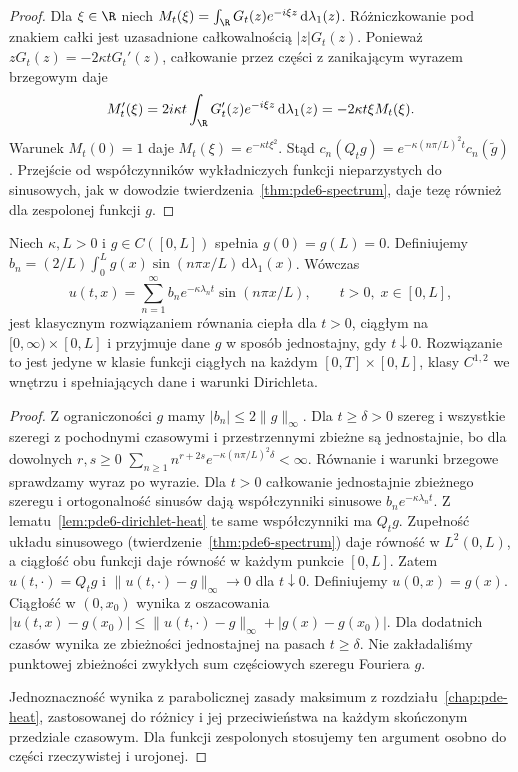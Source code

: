 \begin{proof}
Dla $\xi\in\R$ niech
$M_t(\xi)=\int_{\R}G_t(z)e^{-i\xi z}\,\mathrm d\lambda_1(z)$.
Różniczkowanie pod znakiem całki jest uzasadnione
całkowalnością $|z|G_t(z)$. Ponieważ
$zG_t(z)=-2\kappa tG_t'(z)$, całkowanie przez części
z zanikającym wyrazem brzegowym daje
\[
 M_t'(\xi)=2i\kappa t\int_{\R}G_t'(z)e^{-i\xi z}
 \,\mathrm d\lambda_1(z)=-2\kappa t\xi M_t(\xi).
\]
Warunek $M_t(0)=1$ daje $M_t(\xi)=e^{-\kappa t\xi^2}$.
Stąd $c_n(Q_tg)=e^{-\kappa(n\pi/L)^2t}c_n(\widetilde g)$.
Przejście od współczynników wykładniczych funkcji
nieparzystych do sinusowych, jak w dowodzie
twierdzenia~\ref{thm:pde6-spectrum}, daje tezę również
dla zespolonej funkcji $g$.
\end{proof}

\begin{twierdzenie}
\label{thm:pde6-heat}
Niech $\kappa,L>0$ i $g\in C([0,L])$ spełnia
$g(0)=g(L)=0$. Definiujemy
$b_n=(2/L)\int_0^Lg(x)\sin(n\pi x/L)\,\mathrm d\lambda_1(x)$.
Wówczas
\begin{equation}\label{eq:pde6-heat}
 u(t,x)=\sum_{n=1}^\infty b_n e^{-\kappa\lambda_nt}
 \sin(n\pi x/L),\qquad t>0,\;x\in[0,L],
\end{equation}
jest klasycznym rozwiązaniem równania ciepła dla $t>0$,
ciągłym na $[0,\infty)\times[0,L]$ i przyjmuje dane $g$
w sposób jednostajny, gdy $t\downarrow0$. Rozwiązanie to
jest jedyne w klasie funkcji ciągłych na każdym
$[0,T]\times[0,L]$, klasy $C^{1,2}$ we wnętrzu
i spełniających dane i warunki Dirichleta.
\end{twierdzenie}
\begin{proof}
Z ograniczoności $g$ mamy $|b_n|\le2\|g\|_\infty$.
Dla $t\ge\delta>0$ szereg i wszystkie szeregi
z pochodnymi czasowymi i przestrzennymi zbieżne są
jednostajnie, bo dla dowolnych $r,s\ge0$
$\sum_{n\ge1}n^{r+2s}e^{-\kappa(n\pi/L)^2\delta}<\infty$.
Równanie i warunki brzegowe sprawdzamy wyraz po wyrazie.
Dla $t>0$ całkowanie jednostajnie zbieżnego szeregu
i ortogonalność sinusów dają współczynniki sinusowe
$b_ne^{-\kappa\lambda_nt}$. Z lematu~\ref{lem:pde6-dirichlet-heat}
te same współczynniki ma $Q_tg$. Zupełność układu
sinusowego (twierdzenie~\ref{thm:pde6-spectrum})
daje równość w $L^2(0,L)$, a ciągłość obu funkcji
daje równość w każdym punkcie $[0,L]$.
Zatem $u(t,\cdot)=Q_tg$ i
$\|u(t,\cdot)-g\|_\infty\to0$ dla $t\downarrow0$.
Definiujemy $u(0,x)=g(x)$. Ciągłość w $(0,x_0)$
wynika z oszacowania
$|u(t,x)-g(x_0)|\le\|u(t,\cdot)-g\|_\infty+|g(x)-g(x_0)|$.
Dla dodatnich czasów wynika ze zbieżności jednostajnej
na pasach $t\ge\delta$. Nie zakładaliśmy punktowej
zbieżności zwykłych sum częściowych szeregu Fouriera $g$.

Jednoznaczność wynika z parabolicznej zasady maksimum
z rozdziału~\ref{chap:pde-heat}, zastosowanej do różnicy
i jej przeciwieństwa na każdym skończonym przedziale
czasowym. Dla funkcji zespolonych stosujemy ten argument
osobno do części rzeczywistej i urojonej.
\end{proof}

